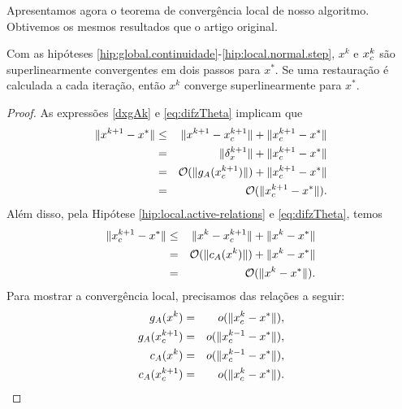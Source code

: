Apresentamos agora o teorema de convergência local de nosso algoritmo. Obtivemos
os mesmos resultados que o artigo original.
\begin{theorem}
 Com as hipóteses \ref{hip:global.continuidade}-\ref{hip:local.normal.step}, $x^k$ e $x_c^{k}$ são superlinearmente convergentes em dois 
passos para $x^*$. Se uma restauração é calculada a cada iteração, então $x^k$ converge 
superlinearmente para $x^*$.
\end{theorem}
\begin{proof}
 As expressões \eqref{dxgAk} e \eqref{eq:difzTheta} implicam que
\begin{eqnarray}
 \norma{x^{k+1}-x^*} & \leq & \norma{x^{k+1} - \xc{k+1}} + \norma{\xc{k+1}-x^*} \nonumber \\
 & = & \norma{\delta_x^{k+1}} + \norma{\xc{k+1} - x^*} \nonumber \\
 & = & \bigo(\norma{\gAk{k+1}}) + \norma{\xc{k+1}-x^*} \nonumber \\
 & = & \bigo(\norma{\xc{k+1} - x^*}). \visiblelbl{eq:limdifxkxe}
\end{eqnarray}
Além disso, pela Hipótese \ref{hip:local.active-relations} e \eqref{eq:difzTheta}, temos
\begin{eqnarray}
 \norma{\xc{k+1} - x^*} & \leq & \norma{x^k - \xc{k+1}} + \norma{x^k - x^*} \nonumber \\
 & = & \bigo(\norma{c_A(x^k)}) + \norma{x^k - x^*} \nonumber \\
 & = & \bigo(\norma{x^k - x^*}). \visiblelbl{eq:limdifxckxe}
\end{eqnarray}
Para mostrar a convergência local, precisamos das relações a seguir:
\begin{eqnarray}
 g_A(x^k) & = & o(\norma{\xc{k} - x^*}), \visiblelbl{eq:limgAxk} \\
 g_A(\xc{k+1}) & = & o(\norma{\xc{k-1} - x^*}), \visiblelbl{eq:limgAxck} \\
 c_A(x^k) & = & o(\norma{\xc{k-1} - x^*}), \visiblelbl{eq:limcxk} \\
 c_A(\xc{k+1}) & = & o(\norma{\xc{k} - x^*}). \visiblelbl{eq:limcxck}
\end{eqnarray}


\end{proof}
